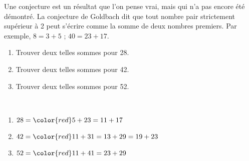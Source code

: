 \begin{exercice*}
   Une conjecture est un résultat que l'on pense vrai, mais qui n'a pas encore été démontré. La conjecture de Goldbach dit que tout nombre pair strictement supérieur à 2 peut s'écrire comme la somme de deux nombres premiers. Par exemple, $8 =3+5$ ; $40 =23+17$.
   \begin{enumerate}
      \item Trouver deux telles sommes pour 28.
      \item Trouver deux telles sommes pour 42.
      \item Trouver deux telles sommes pour 52.
   \end{enumerate}
\end{exercice*}
\begin{corrige}
   \ \\ [-5mm]
   \begin{enumerate}
      \item $28 ={\color{red} 5+23 =11+17}$ \smallskip
      \item $42 ={\color{red} 11+31 =13+29 =19+23}$ \smallskip
      \item $52 ={\color{red} 11+41 = 23+29}$
   \end{enumerate}
\end{corrige}
